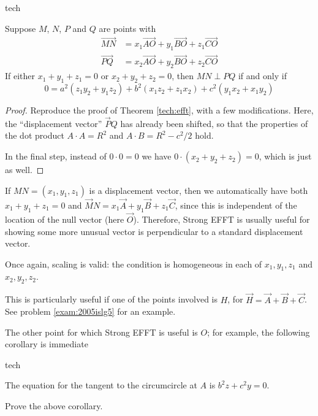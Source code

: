 \begin{StoreCode}{tech}
\label{tech:strongefft}
\begin{theorem}
  Suppose $M$, $N$, $P$ and $Q$ are points with
  \begin{align*}
    \overrightarrow{MN} &= x_1 \overrightarrow{AO} + y_1 \overrightarrow{BO} + z_1 \overrightarrow{CO} \\
    \overrightarrow{PQ} &= x_2 \overrightarrow{AO} + y_2 \overrightarrow{BO} + z_2 \overrightarrow{CO}
  \end{align*}
  If either $x_1+y_1+z_1=0$ or $x_2+y_2+z_2=0$, then $MN \perp PQ$ if and only if
  \[  0 = a^2(z_1y_2 + y_1z_2) + b^2(x_1z_2 + z_1x_2) + c^2(y_1x_2 + x_1y_2)\]
\end{theorem}
\end{StoreCode}
\begin{proof}
  Reproduce the proof of Theorem \ref{tech:efft}, with a few modifications.  Here, the ``displacement vector'' $\vec PQ$ has already been shifted, so that the properties of the dot product $A \cdot A = R^2$ and $A \cdot B = R^2 - c^2/2$ hold.

  In the final step, instead of $0 \cdot 0 = 0$ we have $0 \cdot (x_2+y_2+z_2) = 0$, which is just as well.
\end{proof}
\begin{note}
  If $MN = (x_1,y_1,z_1)$ is a displacement vector, then we automatically have both $x_1+y_1+z_1=0$ and $\vec MN = x_1 \vec A + y_1 \vec B + z_1 \vec C$, since this is independent of the location of the null vector (here $\vec O$).  Therefore, Strong EFFT is usually useful for showing some more unusual vector is perpendicular to a standard displacement vector.

  Once again, scaling is valid: the condition is homogeneous in each of $x_1,y_1,z_1$ and $x_2,y_2,z_2$.
\end{note}

This is particularly useful if one of the points involved is $H$, for $\vec H = \vec A + \vec B + \vec C$.  See problem \ref{exam:2005islg5} for an example.

The other point for which Strong EFFT is useful is $O$; for example, the following corollary is immediate
\begin{StoreCode}{tech}
\begin{corollary}
  The equation for the tangent to the circumcircle at $A$ is $b^2z+c^2y=0$.
\end{corollary}
\end{StoreCode}
\begin{exercise}
  Prove the above corollary.
\end{exercise}







